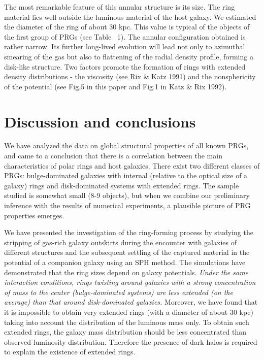 The most remarkable feature of this 
annular structure is its size. The ring material lies well outside the 
luminous material of the host galaxy. 
We estimated the diameter of the ring 
of about 30 kpc. This value is typical of the objects of the first group 
of PRGs (see Table~ 1). 
The annular configuration obtained is rather narrow. 
Its further long-lived evolution will lead not only to azimuthal smearing 
of the gas but also to flattening of the radial density profile, 
forming a disk-like structure. Two factors promote the formation
of rings with extended density distributions - the viscosity
(see Rix \& Katz 1991) and the nonsphericity of the potential
(see Fig.5 in this paper and Fig.1 in Katz \& Rix 1992). 

\section{Discussion and conclusions}

We have analyzed the data on global structural properties of all 
known PRGs, and came to a conclusion that there is a correlation 
between the main characteristics of polar rings and host galaxies. 
There exist two different classes of PRGs: bulge-dominated 
galaxies with internal (relative to the optical size of a galaxy) 
rings and disk-dominated systems with extended rings. 
The sample studied is somewhat small (8-9 objects), but when we 
combine our preliminary inference with the results of 
numerical experiments, a plausible picture of PRG properties 
emerges.   

We have presented the investigation of the ring-forming process by 
studying the stripping of gas-rich galaxy outskirts during the 
encounter with galaxies of different structures and the subsequent 
settling of the captured material in the potential of a companion 
galaxy using an SPH method. 
The simulations have demonstrated that the ring sizes depend on 
galaxy potentials. 
{\it Under the same interaction conditions, rings twisting around 
galaxies with a strong concentration of mass to the center 
(bulge-dominated systems) are less extended (on the average) than 
that around disk-dominated galaxies.} 
Moreover, we have found that it is impossible to obtain 
very extended rings (with a diameter of about 30 kpc) 
taking into account the distribution of the luminous mass only. 
To obtain such extended rings, the galaxy mass distribution  
should be less concentrated than observed luminosity distribution. 
Therefore the presence of dark halos is required to explain the 
existence of extended rings.

